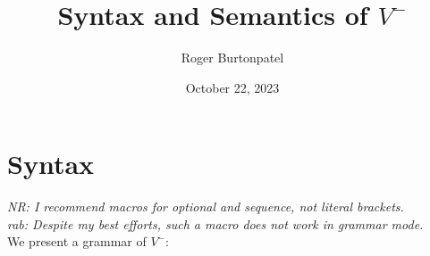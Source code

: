 \documentclass[]{article}
\title{Syntax and Semantics of $V^{-}$}
\author{Roger Burtonpatel}
\date{October 22, 2023}
\newcommand\nr[1]{\leavevmode\emph{NR: #1}}
\newcommand\rab[1]{\leavevmode\emph{rab: #1}}
\begin{document}
\maketitle

\section{Syntax}

\nr{I recommend macros for optional and sequence, not literal brackets.} \\
\rab{Despite my best efforts, such a macro does not work in grammar mode.} \\
We present a grammar of $V^{-}$: 

\bigskip

\end{document}

